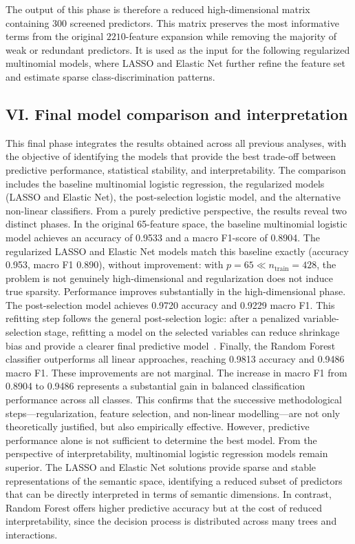 \documentclass{ipgpmaster}
\begin{document}
The output of this phase is therefore a reduced high-dimensional matrix containing \(300\) screened predictors. This matrix preserves the most informative terms from the original \(2210\)-feature expansion while removing the majority of weak or redundant predictors. It is used as the input for the following regularized multinomial models, where LASSO and Elastic Net further refine the feature set and estimate sparse class-discrimination patterns.
\subsection{VI. Final model comparison and interpretation}

This final phase integrates the results obtained across all previous analyses, with the objective of identifying the models that provide the best trade-off between predictive performance, statistical stability, and interpretability. The comparison includes the baseline multinomial logistic regression, the regularized models (LASSO and Elastic Net), the post-selection logistic model, and the alternative non-linear classifiers.
From a purely predictive perspective, the results reveal two distinct phases. In the original 65-feature space, the baseline multinomial logistic model achieves an accuracy of 0.9533 and a macro F1-score of 0.8904. The regularized LASSO and Elastic Net models match this baseline exactly (accuracy 0.953, macro F1 0.890), without improvement: with \(p = 65 \ll n_{\text{train}} = 428\), the problem is not genuinely high-dimensional and regularization does not induce true sparsity. Performance improves substantially in the high-dimensional phase. The post-selection model achieves 0.9720 accuracy and 0.9229 macro F1. This refitting step follows the general post-selection logic: after a penalized variable-selection stage, refitting a model on the selected variables can reduce shrinkage bias and provide a clearer final predictive model~\cite{belloni2013least}. Finally, the Random Forest classifier outperforms all linear approaches, reaching 0.9813 accuracy and 0.9486 macro F1.
These improvements are not marginal. The increase in macro F1 from 0.8904 to 0.9486 represents a substantial gain in balanced classification performance across all classes. This confirms that the successive methodological steps—regularization, feature selection, and non-linear modelling—are not only theoretically justified, but also empirically effective.
However, predictive performance alone is not sufficient to determine the best model. From the perspective of interpretability, multinomial logistic regression models remain superior. The LASSO and Elastic Net solutions provide sparse and stable representations of the semantic space, identifying a reduced subset of predictors that can be directly interpreted in terms of semantic dimensions. In contrast, Random Forest offers higher predictive accuracy but at the cost of reduced interpretability, since the decision process is distributed across many trees and interactions.
\end{document}
